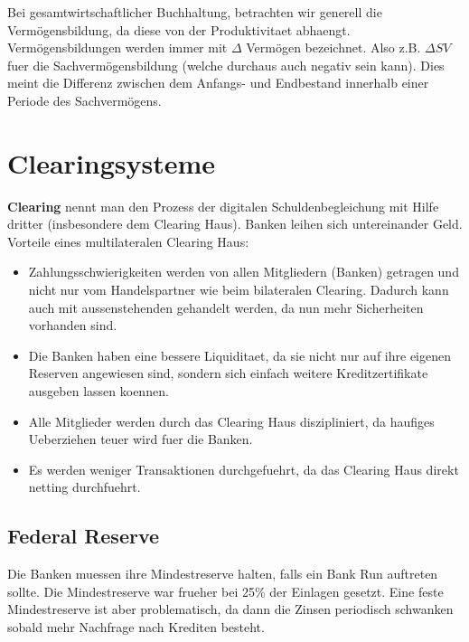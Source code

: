 \documentclass[a4paper]{article}
\begin{document}
Bei gesamtwirtschaftlicher Buchhaltung, betrachten wir generell die
Vermögensbildung, da diese von der Produktivitaet abhaengt.
\\

Verm\"ogensbildungen werden immer mit $\Delta$ Verm\"ogen bezeichnet. Also
z.B. $\Delta SV$ fuer die Sachvermögensbildung (welche durchaus auch negativ
sein kann). Dies meint die Differenz
zwischen dem Anfangs- und Endbestand innerhalb einer Periode des Sachvermögens.

\section{Clearingsysteme}

\textbf{Clearing} nennt man den Prozess der digitalen Schuldenbegleichung
mit Hilfe dritter (insbesondere dem Clearing Haus).
Banken leihen sich untereinander Geld. \\

Vorteile eines multilateralen Clearing Haus:

\begin{itemize}
	\item Zahlungsschwierigkeiten werden von allen Mitgliedern (Banken) getragen
	      und nicht nur vom Handelspartner wie beim bilateralen Clearing. Dadurch
	      kann auch mit aussenstehenden gehandelt werden, da nun mehr Sicherheiten
	      vorhanden sind.

	\item Die Banken haben eine bessere Liquiditaet, da sie nicht nur auf ihre
	      eigenen Reserven angewiesen sind, sondern sich einfach weitere
	      Kreditzertifikate ausgeben lassen koennen.

	\item Alle Mitglieder werden durch das Clearing Haus diszipliniert, da
	      haufiges Ueberziehen teuer wird fuer die Banken.

	\item Es werden weniger Transaktionen durchgefuehrt, da das Clearing Haus
	      direkt netting durchfuehrt.
\end{itemize}

\subsection{Federal Reserve}

Die Banken muessen ihre Mindestreserve halten, falls ein Bank Run auftreten
sollte. Die Mindestreserve war frueher bei 25\% der Einlagen gesetzt. Eine
feste Mindestreserve ist aber problematisch, da dann die Zinsen periodisch
schwanken sobald mehr Nachfrage nach Krediten besteht. \\
\end{document}

